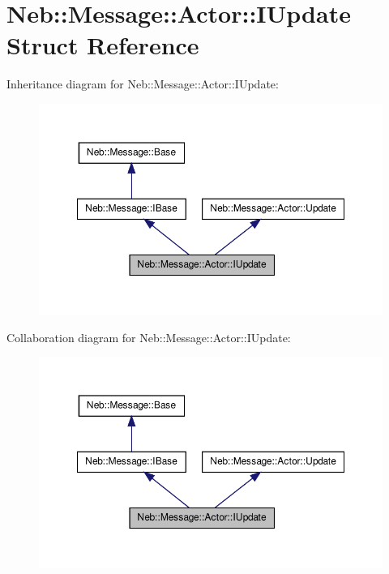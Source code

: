 \hypertarget{structNeb_1_1Message_1_1Actor_1_1IUpdate}{\section{\-Neb\-:\-:\-Message\-:\-:\-Actor\-:\-:\-I\-Update \-Struct \-Reference}
\label{structNeb_1_1Message_1_1Actor_1_1IUpdate}
}


\-Inheritance diagram for \-Neb\-:\-:\-Message\-:\-:\-Actor\-:\-:\-I\-Update\-:\nopagebreak
\begin{figure}[H]
\begin{center}
\leavevmode
\includegraphics[width=350pt]{structNeb_1_1Message_1_1Actor_1_1IUpdate__inherit__graph}
\end{center}
\end{figure}


\-Collaboration diagram for \-Neb\-:\-:\-Message\-:\-:\-Actor\-:\-:\-I\-Update\-:\nopagebreak
\begin{figure}[H]
\begin{center}
\leavevmode
\includegraphics[width=350pt]{structNeb_1_1Message_1_1Actor_1_1IUpdate__coll__graph}
\end{center}
\end{figure}
